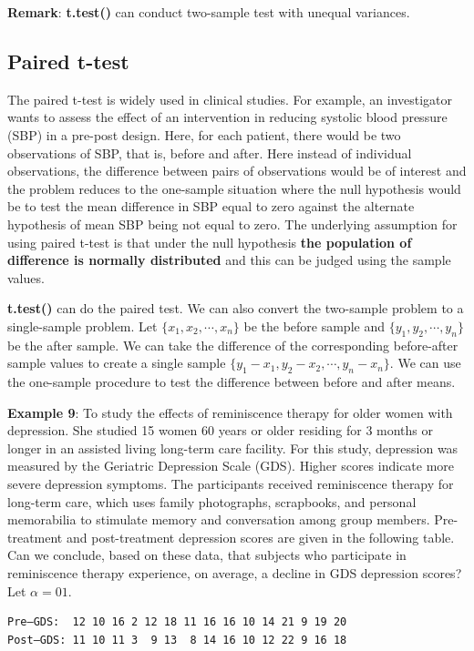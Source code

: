 \documentclass[
]{book}
\begin{document}
\textbf{Remark}: \textbf{t.test()} can conduct two-sample test with unequal variances.

\hypertarget{paired-t-test}{%
\subsection{Paired t-test}\label{paired-t-test}}

The paired t-test is widely used in clinical studies. For example, an investigator wants to assess the effect of an intervention in reducing systolic blood pressure (SBP) in a pre-post design. Here, for each patient, there would be two observations of SBP, that is, before and after. Here instead of individual observations, the difference between pairs of observations would be of interest and the problem reduces to the one-sample situation where the null hypothesis would be to test the mean difference in SBP equal to zero against the alternate hypothesis of mean SBP being not equal to zero. The underlying assumption for using paired t-test is that under the null hypothesis \textbf{the population of difference is normally distributed} and this can be judged using the sample values.

\textbf{t.test()} can do the paired test. We can also convert the two-sample problem to a single-sample problem. Let \(\{x_1, x_2, \cdots, x_n \}\) be the before sample and \(\{y_1, y_2, \cdots, y_n \}\) be the after sample. We can take the difference of the corresponding before-after sample values to create a single sample \(\{y_1-x_1, y_2-x_2, \cdots, y_n-x_n \}\). We can use the one-sample procedure to test the difference between before and after means.

\textbf{Example 9}: To study the effects of reminiscence therapy for older women with depression. She studied 15 women 60 years or older residing for 3 months or longer in an assisted living long-term care facility. For this study, depression was measured by the Geriatric Depression Scale (GDS). Higher scores indicate more severe depression symptoms. The participants received reminiscence therapy for long-term care, which uses family photographs, scrapbooks, and personal memorabilia to stimulate memory and conversation among group members. Pre-treatment and post-treatment
depression scores are given in the following table. Can we conclude, based on these data, that subjects who participate in reminiscence therapy experience, on average, a decline in GDS depression scores? Let \(\alpha = 01\).

\begin{verbatim}
Pre–GDS:  12 10 16 2 12 18 11 16 16 10 14 21 9 19 20
Post–GDS: 11 10 11 3  9 13  8 14 16 10 12 22 9 16 18
\end{verbatim}
\end{document}
